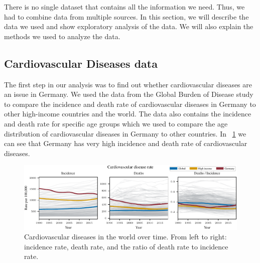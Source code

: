 
There is no single dataset that contains all the information we need. Thus, we had to combine data from multiple sources. In this section, we will describe the data we used and show exploratory analysis of the data. We will also explain the methods we used to analyze the data.

\subsection{Cardiovascular Diseases data}\label{sec:cardiovascular_data}

The first step in our analysis was to find out whether cardiovascular diseases are an issue in Germany. We used the data from the Global Burden of Disease study \citep{GBD2019} 
to compare the incidence and death rate of cardiovascular diseases in Germany to other high-income countries and the world. The data also contains 
the incidence and death rate for specific age groups which we used to compare the age distribution of cardiovascular diseases in Germany to other countries.
In \figurename~\ref{Cardiovascular diseases over time} we can see that Germany has very high incidence and death rate of cardiovascular diseases. 
\begin{figure}[h]
    \vskip 0.2in
    \centering
    \centerline{\includegraphics[]{fig/fig_cardiovascular_disease_rate.pdf}}
    \caption{Cardiovascular diseases in the world over time. From left to right: incidence rate, death rate, 
    and the ratio of death rate to incidence rate.}
    \label{Cardiovascular diseases over time}
\end{figure}

